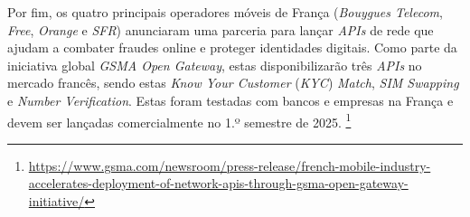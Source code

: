 Por fim, os quatro principais operadores móveis de França (\emph{Bouygues
	Telecom}, \emph{Free}, \emph{Orange} e \emph{SFR}) anunciaram uma parceria para
lançar \emph{APIs} de rede que ajudam a combater fraudes online e proteger
identidades digitais. Como parte da iniciativa global \emph{GSMA Open Gateway},
estas disponibilizarão três \emph{APIs} no mercado francês, sendo estas
\emph{Know Your Customer} (\emph{KYC}) \emph{Match}, \emph{SIM Swapping} e
\emph{Number Verification}. Estas foram testadas com bancos e empresas na
França e devem ser lançadas comercialmente no 1.º semestre de 2025.
\footnote{\url{https://www.gsma.com/newsroom/press-release/french-mobile-industry-accelerates-deployment-of-network-apis-through-gsma-open-gateway-initiative/}}
